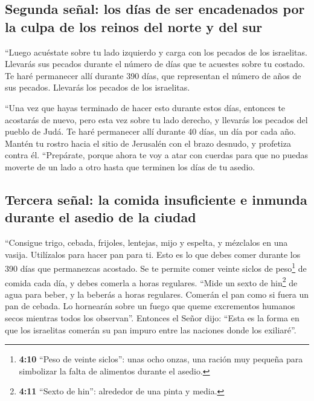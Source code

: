 \hypertarget{segunda-seuxf1al-los-duxedas-de-ser-encadenados-por-la-culpa-de-los-reinos-del-norte-y-del-sur}{%
\subsection{Segunda señal: los días de ser encadenados por la culpa de
los reinos del norte y del
sur}\label{segunda-seuxf1al-los-duxedas-de-ser-encadenados-por-la-culpa-de-los-reinos-del-norte-y-del-sur}}

 ``Luego acuéstate sobre tu lado izquierdo y carga con los
pecados de los israelitas. Llevarás sus pecados durante el número de
días que te acuestes sobre tu costado.  Te haré permanecer
allí durante 390 días, que representan el número de años de sus pecados.
Llevarás los pecados de los israelitas.

 ``Una vez que hayas terminado de hacer esto durante estos
días, entonces te acostarás de nuevo, pero esta vez sobre tu lado
derecho, y llevarás los pecados del pueblo de Judá. Te haré permanecer
allí durante 40 días, un día por cada año.  Mantén tu
rostro hacia el sitio de Jerusalén con el brazo desnudo, y profetiza
contra él.  ``Prepárate, porque ahora te voy a atar con
cuerdas para que no puedas moverte de un lado a otro hasta que terminen
los días de tu asedio.

\hypertarget{tercera-seuxf1al-la-comida-insuficiente-e-inmunda-durante-el-asedio-de-la-ciudad}{%
\subsection{Tercera señal: la comida insuficiente e inmunda durante el
asedio de la
ciudad}\label{tercera-seuxf1al-la-comida-insuficiente-e-inmunda-durante-el-asedio-de-la-ciudad}}

 ``Consigue trigo, cebada, frijoles, lentejas, mijo y
espelta, y mézclalos en una vasija. Utilízalos para hacer pan para ti.
Esto es lo que debes comer durante los 390 días que permanezcas
acostado.  Se te permite comer veinte siclos de
peso\footnote{\textbf{4:10} ``Peso de veinte siclos'': unas ocho onzas,
  una ración muy pequeña para simbolizar la falta de alimentos durante
  el asedio.} de comida cada día, y debes comerla a horas regulares.
 ``Mide un sexto de hin\footnote{\textbf{4:11} ``Sexto de
  hin'': alrededor de una pinta y media.} de agua para beber, y la
beberás a horas regulares.  Comerán el pan como si fuera
un pan de cebada. Lo hornearán sobre un fuego que queme excrementos
humanos secos mientras todos los observan''.  Entonces el
Señor dijo: ``Esta es la forma en que los israelitas comerán su pan
impuro entre las naciones donde los exiliaré''.

